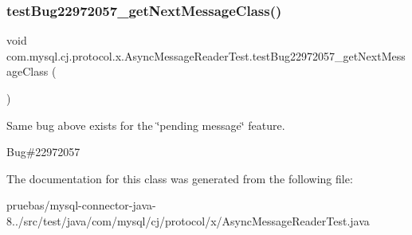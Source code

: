 \subsubsection{\texorpdfstring{test\+Bug22972057\+\_\+get\+Next\+Message\+Class()}{testBug22972057\_getNextMessageClass()}}
{\footnotesize\ttfamily void com.\+mysql.\+cj.\+protocol.\+x.\+Async\+Message\+Reader\+Test.\+test\+Bug22972057\+\_\+get\+Next\+Message\+Class (\begin{DoxyParamCaption}{ }\end{DoxyParamCaption})}

Same bug above exists for the \char`\"{}pending message\char`\"{} feature.

Bug\#22972057 

The documentation for this class was generated from the following file\+:\begin{DoxyCompactItemize}
\item 
pruebas/mysql-\/connector-\/java-\/8../src/test/java/com/mysql/cj/protocol/x/Async\+Message\+Reader\+Test.\+java\end{DoxyCompactItemize}
